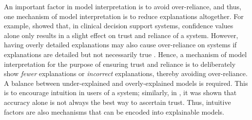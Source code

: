 An important factor in model interpretation is to avoid over-reliance, and thus, one mechanism of model interpretation is to reduce explanations  altogether. For example, \citet{Bussone:2015wm} showed that, in clinical decision support systems, confidence values alone only results in a slight effect on trust and reliance of a system. However, having overly detailed explanations may also cause over-reliance on systems if explanations are detailed but not necessarily true \citep{Bussone:2015wm}. Hence, a mechanism of model interpretation for the purpose of ensuring trust and reliance is to deliberately show \textit{fewer} explanations or \textit{incorrect} explanations, thereby avoiding over-reliance. A balance between under-explained and overly-explained models is required. This is to encourage intuition in users of a system; similarly, in \citet{Ribeiro:2016gg}, it was shown that accuracy alone is not always the best way to ascertain trust. Thus, intuitive factors are also mechanisms that can be encoded into explainable models.
